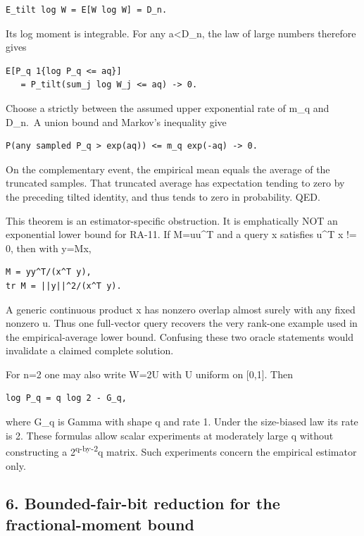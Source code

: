 \documentclass[
  10pt,
]{article}
\begin{document}
\begin{verbatim}
E_tilt log W = E[W log W] = D_n.
\end{verbatim}

Its log moment is integrable. For any a\textless D\_n, the law of large
numbers therefore gives

\begin{verbatim}
E[P_q 1{log P_q <= aq}]
   = P_tilt(sum_j log W_j <= aq) -> 0.
\end{verbatim}

Choose a strictly between the assumed upper exponential rate of m\_q and
D\_n.~A union bound and Markov's inequality give

\begin{verbatim}
P(any sampled P_q > exp(aq)) <= m_q exp(-aq) -> 0.
\end{verbatim}

On the complementary event, the empirical mean equals the average of the
truncated samples. That truncated average has expectation tending to
zero by the preceding tilted identity, and thus tends to zero in
probability. QED.

This theorem is an estimator-specific obstruction. It is emphatically
NOT an exponential lower bound for RA-11. If M=uu\^{}T and a query x
satisfies u\^{}T x != 0, then with y=Mx,

\begin{verbatim}
M = yy^T/(x^T y),
tr M = ||y||^2/(x^T y).
\end{verbatim}

A generic continuous product x has nonzero overlap almost surely with
any fixed nonzero u. Thus one full-vector query recovers the very
rank-one example used in the empirical-average lower bound. Confusing
these two oracle statements would invalidate a claimed complete
solution.

For n=2 one may also write W=2U with U uniform on {[}0,1{]}. Then

\begin{verbatim}
log P_q = q log 2 - G_q,
\end{verbatim}

where G\_q is Gamma with shape q and rate 1. Under the size-biased law
its rate is 2. These formulas allow scalar experiments at moderately
large q without constructing a 2\textsuperscript{q-by-2}q matrix. Such
experiments concern the empirical estimator only.

\subsection{6. Bounded-fair-bit reduction for the fractional-moment
bound}\label{bounded-fair-bit-reduction-for-the-fractional-moment-bound}
\end{document}
